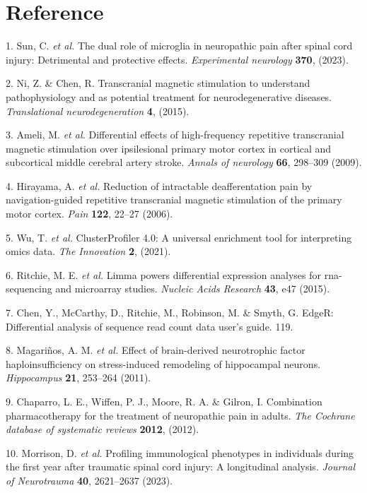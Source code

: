 \documentclass[
]{article}
\newenvironment{cslreferences}%
  {}%
  {\par}
\begin{document}
\hypertarget{bibliography}{%
\section*{Reference}\label{bibliography}}

\hypertarget{refs}{}
\begin{cslreferences}
\leavevmode\hypertarget{ref-TheDualRoleOSunC2023}{}%
1. Sun, C. \emph{et al.} The dual role of microglia in neuropathic pain after spinal cord injury: Detrimental and protective effects. \emph{Experimental neurology} \textbf{370}, (2023).

\leavevmode\hypertarget{ref-TranscranialMaNiZh2015}{}%
2. Ni, Z. \& Chen, R. Transcranial magnetic stimulation to understand pathophysiology and as potential treatment for neurodegenerative diseases. \emph{Translational neurodegeneration} \textbf{4}, (2015).

\leavevmode\hypertarget{ref-DifferentialEfAmeli2009}{}%
3. Ameli, M. \emph{et al.} Differential effects of high-frequency repetitive transcranial magnetic stimulation over ipsilesional primary motor cortex in cortical and subcortical middle cerebral artery stroke. \emph{Annals of neurology} \textbf{66}, 298--309 (2009).

\leavevmode\hypertarget{ref-ReductionOfInHiraya2006}{}%
4. Hirayama, A. \emph{et al.} Reduction of intractable deafferentation pain by navigation-guided repetitive transcranial magnetic stimulation of the primary motor cortex. \emph{Pain} \textbf{122}, 22--27 (2006).

\leavevmode\hypertarget{ref-ClusterprofilerWuTi2021}{}%
5. Wu, T. \emph{et al.} ClusterProfiler 4.0: A universal enrichment tool for interpreting omics data. \emph{The Innovation} \textbf{2}, (2021).

\leavevmode\hypertarget{ref-LimmaPowersDiRitchi2015}{}%
6. Ritchie, M. E. \emph{et al.} Limma powers differential expression analyses for rna-sequencing and microarray studies. \emph{Nucleic Acids Research} \textbf{43}, e47 (2015).

\leavevmode\hypertarget{ref-EdgerDifferenChen}{}%
7. Chen, Y., McCarthy, D., Ritchie, M., Robinson, M. \& Smyth, G. EdgeR: Differential analysis of sequence read count data user's guide. 119.

\leavevmode\hypertarget{ref-EffectOfBrainMagari2011}{}%
8. Magariños, A. M. \emph{et al.} Effect of brain-derived neurotrophic factor haploinsufficiency on stress-induced remodeling of hippocampal neurons. \emph{Hippocampus} \textbf{21}, 253--264 (2011).

\leavevmode\hypertarget{ref-CombinationPhaChapar2012}{}%
9. Chaparro, L. E., Wiffen, P. J., Moore, R. A. \& Gilron, I. Combination pharmacotherapy for the treatment of neuropathic pain in adults. \emph{The Cochrane database of systematic reviews} \textbf{2012}, (2012).

\leavevmode\hypertarget{ref-ProfilingImmunMorris2023}{}%
10. Morrison, D. \emph{et al.} Profiling immunological phenotypes in individuals during the first year after traumatic spinal cord injury: A longitudinal analysis. \emph{Journal of Neurotrauma} \textbf{40}, 2621--2637 (2023).
\end{cslreferences}
\end{document}
